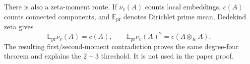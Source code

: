 \begin{remark}\label{rem:degree-four-alternatives}
There is also a zeta-moment route.  If \(\nu_v(A)\) counts local embeddings,
\(c(A)\) counts connected components, and \(\mathbb E_{\mathrm{pr}}\) denotes
Dirichlet prime mean, Dedekind zeta gives
\[
 \mathbb E_{\mathrm{pr}}\nu_v(A)=c(A),
 \qquad
 \mathbb E_{\mathrm{pr}}\nu_v(A)^2=c(A\otimes_KA).
\]
The resulting first/second-moment contradiction proves the same degree-four
theorem and explains the \(2+3\) threshold.  It is not used in the paper
proof.
\end{remark}
